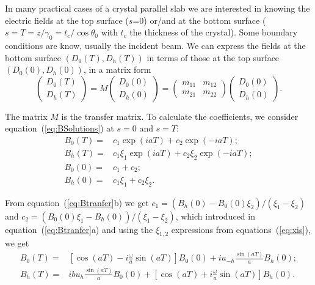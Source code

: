 \documentclass[preprint]{iucr}              %
\begin{document}
In many practical cases of a crystal parallel slab we are interested in knowing the electric fields at the top surface ($s$=0) or/and at the bottom surface ($s=T=z/\gamma_0=t_c/\cos\theta_0$ with $t_c$ the thickness of the crystal). Some boundary conditions are know, usually the incident beam.   
We can express the fields at the bottom surface $(D_0(T),D_h(T))$ in terms of those at the top surface $(D_0(0),D_h(0))$, in a matrix form
\begin{equation}\label{eq:Mtransfer}
    \begin{pmatrix}
    D_0(T)\\
    D_h(T)
    \end{pmatrix}
    =
    M
        \begin{pmatrix}
    D_0(0) \\
    D_h(0)
    \end{pmatrix}
    =
    \begin{pmatrix}
    m_{11} & m_{12}\\
    m_{21} & m_{22}
    \end{pmatrix}
    \begin{pmatrix}
    D_0(0) \\
    D_h(0)
    \end{pmatrix}.
\end{equation}

The matrix $M$ is the transfer matrix. To calculate  the coefficients, we consider equation~(\ref{eq:BSolutions}) at $s=0$ and $s=T$: 
\begin{subequations}
\label{eq:Btranfer}
\begin{align}
B_0(T) = &c_1 \exp(i a T) + c_2 \exp(-i a T) ; \\
B_h(T) = &c_1 \xi_1 \exp(i a T) + c_2 \xi_2 \exp(-i a T) ; \nonumber \\
B_0(0) = &c_1 + c_2  ; \\
B_h(0) = &c_1 \xi_1 + c_2 \xi_2.  \nonumber  
\end{align}
\end{subequations}

From equation~(\ref{eq:Btranfer}b) we get $c_1=(B_h(0)-B_0(0)\xi_2)/(\xi_1-\xi_2)$ and $c_2=(B_0(0)\xi_1-B_h(0))/(\xi_1-\xi_2)$, which introduced in equation~(\ref{eq:Btranfer}a) and using the $\xi_{1,2}$ expressions from equations~(\ref{eq:xis}), we get
\begin{subequations}
\label{eq:BtranferFinal}
\begin{align}
B_0(T) = & \left[\cos(aT)-i\frac{\omega}{a}\sin(aT)\right] B_0(0) + i u_{-h}\frac{\sin(aT)}{a} B_h(0); \\
B_h(T) = & i b u_h \frac{\sin(aT)}{a} B_0(0) + \left[ \cos(aT)+i\frac{\omega}{a}\sin(aT)\right] B_h(0).
\end{align}
\end{subequations}
\end{document}
